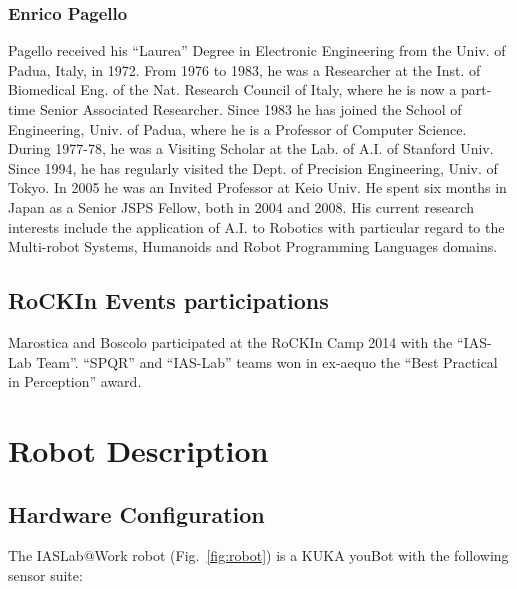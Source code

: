 \documentclass[conference]{IEEEtran}
\begin{document}
\subsubsection*{Enrico Pagello}
Pagello received his “Laurea” Degree in Electronic Engineering from the Univ. of Padua, Italy, in 1972. From 1976 to 1983, he was a Researcher at the Inst. of Biomedical Eng. of the Nat. Research Council of Italy, where he is now a part-time Senior Associated Researcher. Since 1983 he has joined the School of Engineering, Univ. of Padua, where he is a Professor of Computer Science. 
During 1977-78, he was a Visiting Scholar at the Lab. of A.I. of Stanford Univ. Since 1994, he has regularly visited the Dept. of Precision Engineering, Univ. of Tokyo. In 2005 he was an Invited Professor at Keio Univ. He spent six months in Japan as a Senior JSPS Fellow, both in 2004 and 2008. His current research interests include the application of A.I. to Robotics with particular regard to the Multi-robot Systems, Humanoids and Robot Programming Languages domains. 

\subsection{RoCKIn Events participations}
Marostica and Boscolo participated at the RoCKIn Camp 2014 with the ``IAS-Lab Team''. ``SPQR'' and ``IAS-Lab'' teams won in ex-aequo the ``Best Practical in Perception'' award.

\section{Robot Description}

\subsection{Hardware Configuration}

The IASLab@Work robot (Fig.~\ref{fig:robot}) is a KUKA youBot with the following sensor suite:
\end{document}
